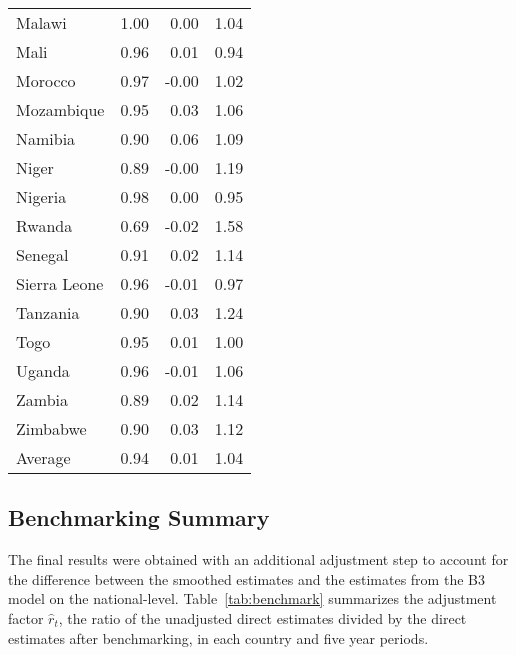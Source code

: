 \documentclass[12pt]{article}\usepackage[]{graphicx}\usepackage[]{color}
\begin{document}
\begin{table}[ht]
\begin{tabular}{lrrr}
  Malawi & 1.00 & 0.00 & 1.04 \\ 
  Mali & 0.96 & 0.01 & 0.94 \\ 
  Morocco & 0.97 & -0.00 & 1.02 \\ 
  Mozambique & 0.95 & 0.03 & 1.06 \\ 
  Namibia & 0.90 & 0.06 & 1.09 \\ 
  Niger & 0.89 & -0.00 & 1.19 \\ 
  Nigeria & 0.98 & 0.00 & 0.95 \\ 
  Rwanda & 0.69 & -0.02 & 1.58 \\ 
  Senegal & 0.91 & 0.02 & 1.14 \\ 
  Sierra Leone & 0.96 & -0.01 & 0.97 \\ 
  Tanzania & 0.90 & 0.03 & 1.24 \\ 
  Togo & 0.95 & 0.01 & 1.00 \\ 
  Uganda & 0.96 & -0.01 & 1.06 \\ 
  Zambia & 0.89 & 0.02 & 1.14 \\ 
  Zimbabwe & 0.90 & 0.03 & 1.12 \\ 
  \hline
  Average & 0.94 & 0.01 & 1.04 \\ 
   \bottomrule
\end{tabular}
\end{table}


\subsection{Benchmarking Summary}
 The final results were obtained with an additional adjustment step to account for the difference between the smoothed estimates and the estimates from the B3 model \cite{alkema:new:14} on the national-level. Table~\ref{tab:benchmark} summarizes the adjustment factor $\hat r_{t}$, the ratio of the unadjusted direct estimates divided by the direct estimates after benchmarking, in each country and five year periods. 
\end{document}
